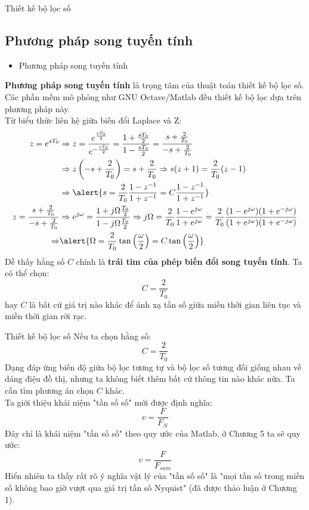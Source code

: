 \documentclass[8pt]{beamer}
\begin{document}
\begin{frame}{Thiết kế bộ lọc số}
\subsection{Phương pháp song tuyến tính}
\begin{itemize}
	\item Phương pháp song tuyến tính
\end{itemize}
\textbf{Phương pháp song tuyến tính} là trọng tâm của thuật toán thiết kế bộ lọc số. Các phần mềm mô phỏng như GNU Octave/Matlab đều thiết kế bộ lọc dựa trên phương pháp này.
\\ Từ biểu thức liên hệ giữa biến đổi Laplace và Z:
\begin{equation*}
\begin{split}
	z=e^{sT_{0}}&\Rightarrow z=\frac{e^{\frac{sT_{0}}{2}}}{e^{-\frac{sT_{0}}{2}}}=\frac{1+\frac{sT_{0}}{2}}{1-\frac{sT_{0}}{2}}=\frac{s+\frac{2}{T_{0}}}{-s+\frac{2}{T_{0}}}\\
		    &\Rightarrow z\left(-s+\frac{2}{T_{0}}\right)=s+\frac{2}{T_{0}}\Rightarrow s(z+1)=\frac{2}{T_{0}}(z-1)\\
		    &\Rightarrow \alert{s=\frac{2}{T_{0}}\frac{1-z^{-1}}{1+z^{-1}}=C\frac{1-z^{-1}}{1+z^{-1}}}\\
	z=\frac{s+\frac{2}{T_{0}}}{-s+\frac{2}{T_{0}}}&\Rightarrow e^{j\omega}=\frac{1+j\Omega\frac{T_{0}}{2}}{1-j\Omega\frac{T_{0}}{2}}\Rightarrow j\Omega=\frac{2}{T_{0}}\frac{1-e^{j\omega}}{1+e^{j\omega}}=\frac{2}{T_{0}}\frac{(1-e^{j\omega})(1+e^{-j\omega})}{(1+e^{j\omega})(1+e^{-j\omega})}\\
	\Rightarrow& \alert{\Omega=\frac{2}{T_{0}}\tan\left(\frac{\omega}{2}\right)=C\tan\left(\frac{\omega}{2}\right)}
\end{split}
\end{equation*}
Dễ thấy hằng số $C$ chính là \textbf{trái tim của phép biến đổi song tuyến tính}.
Ta có thể chọn: $$C=\frac{2}{T_{0}}$$
hay $C$ là bất cứ giá trị nào khác để \alert{ánh xạ tần số giữa miền thời gian liên tục và miền thời gian rời rạc.}
\end{frame}
\begin{frame}{Thiết kế bộ lọc số}
Nếu ta chọn hằng số: $$C=\frac{2}{T_{0}}$$
Dạng đáp ứng biên độ giữa bộ lọc tương tự và bộ lọc số tương đối giống nhau về dáng điệu đồ thị, nhưng ta không biết thêm bất cứ thông tin nào khác nữa. Ta cần tìm phương án chọn $C$ khác.
\\  Ta giới thiệu khái niệm "tần số số" mới được định nghĩa: $$v=\frac{F}{F_{N}}$$
Đây chỉ là khái niệm "tần số số" theo quy ước của Matlab, ở \alert{Chương 5} ta sẽ quy ước: $$v=\frac{F}{F_{sam}}$$
Hiển nhiên ta thấy rất rõ ý nghĩa vật lý của "tần số số" là "mọi tần số trong miền số không bao giờ vượt qua giá trị tần số Nyquist" (đã được thảo luận ở \alert{Chương 1}).
\end{frame}
\end{document}
